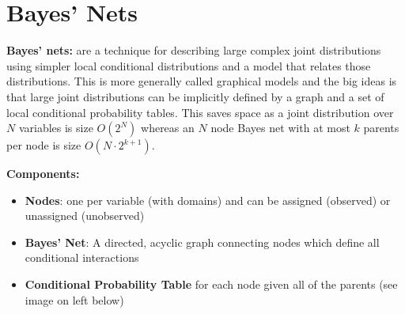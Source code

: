 \documentclass[11pt]{article}
\begin{document}
\section{Bayes' Nets}
\textbf{Bayes' nets:} are a technique for describing large complex joint distributions using simpler local conditional distributions and a model that relates those distributions. This is more generally called graphical models and the big ideas is that large joint distributions can be implicitly defined by a graph and a set of local conditional probability tables. This saves space as a joint distribution over $N$ variables is size $O(2^N)$ whereas an $N$ node Bayes net with at most $k$ parents per node is size $O(N \cdot 2^{k+1})$.

\textbf{Components:}
\begin{itemize}
  \item \textbf{Nodes}: one per variable (with domains) and can be assigned (observed) or unassigned (unobserved)
  \item \textbf{Bayes' Net}: A directed, acyclic graph connecting nodes which define all conditional interactions
  \item \textbf{Conditional Probability Table} for each node given all of the parents (see image on left below)
\end{itemize}
\end{document}
